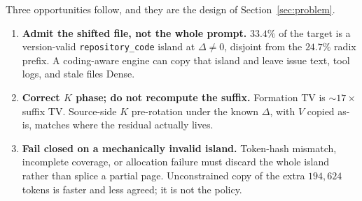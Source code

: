 Three opportunities follow, and they are the design of
Section~\ref{sec:problem}.

\begin{enumerate}[leftmargin=1.2em,itemsep=0.12em]
    \item \textbf{Admit the shifted file, not the whole prompt.}
          $33.4\%$ of the target is a version-valid
          \texttt{repository\_code} island at $\Delta\neq 0$, disjoint
          from the $24.7\%$ radix prefix. A coding-aware engine can copy
          that island and leave issue text, tool logs, and stale files
          Dense.
    \item \textbf{Correct $K$ phase; do not recompute the suffix.}
          Formation TV is ${\sim}17\times$ suffix TV. Source-side $K$
          pre-rotation under the known $\Delta$, with $V$ copied as-is,
          matches where the residual actually lives.
    \item \textbf{Fail closed on a mechanically invalid island.}
          Token-hash mismatch, incomplete coverage, or allocation
          failure must discard the whole island rather than splice a
          partial page. Unconstrained copy of the extra $194{,}624$
          tokens is faster and less agreed; it is not the policy.
\end{enumerate}
